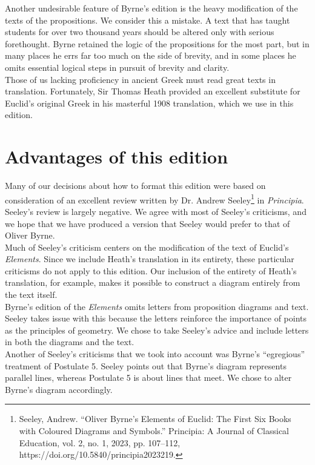 \documentclass[12pt, twoside]{memoir}
\begin{document}
Another undesirable feature of Byrne's edition is the heavy modification of the texts of the propositions. We consider this a mistake. A text that has taught students for over two thousand years should be altered only with serious forethought. Byrne retained the logic of the propositions for the most part, but in many places he errs far too much on the side of brevity, and in some places he omits essential logical steps in pursuit of brevity and clarity.\\

Those of us lacking proficiency in ancient Greek must read great texts in translation. Fortunately, Sir Thomas Heath provided an excellent substitute for Euclid's original Greek in his masterful 1908 translation, which we use in this edition.
 
\section*{Advantages of this edition}
Many of our decisions about how to format this edition were based on consideration of an excellent review written by Dr. Andrew Seeley\footnote{Seeley, Andrew. “Oliver Byrne’s Elements of Euclid: The First Six Books with Coloured Diagrams and Symbols.” Principia: A Journal of Classical Education, vol. 2, no. 1, 2023, pp. 107–112, https://doi.org/10.5840/principia2023219.} in \textit{Principia}. Seeley's review is largely negative. We agree with most of Seeley's criticisms, and we hope that we have produced a version that Seeley would prefer to that of Oliver Byrne.\\

Much of Seeley's criticism centers on the modification of the text of Euclid's \textit{Elements}. Since we include Heath's translation in its entirety, these particular criticisms do not apply to this edition. Our inclusion of the entirety of Heath's translation, for example, makes it possible to construct a diagram entirely from the text itself.\\

Byrne's edition of the \textit{Elements} omits letters from proposition diagrams and text. Seeley takes issue with this because the letters reinforce the importance of points as the principles of geometry. We chose to take Seeley's advice and include letters in both the diagrams and the text. \\

Another of Seeley's criticisms that we took into account was Byrne's ``egregious'' treatment of Postulate 5. Seeley points out that Byrne's diagram represents parallel lines, whereas Postulate 5 is about lines that meet. We chose to alter Byrne's diagram accordingly.\\
\end{document}
